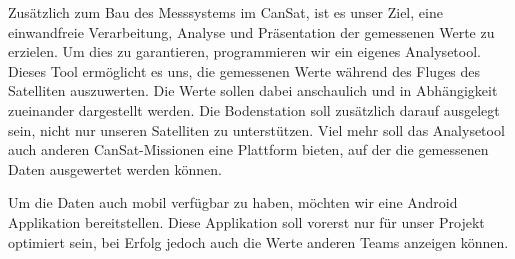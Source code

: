 Zusätzlich zum Bau des Messsystems im CanSat, ist es unser Ziel, eine einwandfreie Verarbeitung, Analyse und Präsentation der gemessenen Werte zu erzielen. Um dies zu garantieren, programmieren wir ein eigenes Analysetool. Dieses Tool ermöglicht es uns, die gemessenen Werte während des Fluges des Satelliten auszuwerten. Die Werte sollen dabei anschaulich und in Abhängigkeit zueinander dargestellt werden. Die Bodenstation soll zusätzlich darauf ausgelegt sein, nicht nur unseren Satelliten zu unterstützen. Viel mehr soll das Analysetool auch anderen CanSat-Missionen eine Plattform bieten, auf der die gemessenen Daten ausgewertet werden können.

Um die Daten auch mobil verfügbar zu haben, möchten wir eine Android Applikation bereitstellen. Diese Applikation soll vorerst nur für unser Projekt optimiert sein, bei Erfolg jedoch auch die Werte anderen Teams anzeigen können.